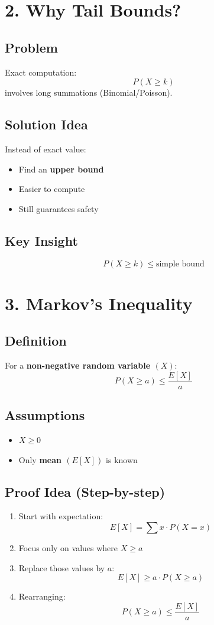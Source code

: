 \documentclass[11pt]{article}
\begin{document}
\section*{2. Why Tail Bounds?}

\subsection*{Problem}
Exact computation:
\[
P(X \ge k)
\]
involves long summations (Binomial/Poisson).

\subsection*{Solution Idea}
Instead of exact value:
\begin{itemize}
\item Find an \textbf{upper bound}
\item Easier to compute
\item Still guarantees safety
\end{itemize}

\subsection*{Key Insight}
\[
P(X \ge k) \le \text{simple bound}
\]

\section*{3. Markov’s Inequality}

\subsection*{Definition}
For a \textbf{non-negative random variable $(X)$}:
\[
P(X \ge a) \le \frac{E[X]}{a}
\]

\subsection*{Assumptions}
\begin{itemize}
\item $X \ge 0$
\item Only \textbf{mean $(E[X])$} is known
\end{itemize}

\subsection*{Proof Idea (Step-by-step)}
\begin{enumerate}
\item Start with expectation:
\[
E[X] = \sum x \cdot P(X=x)
\]
\item Focus only on values where $X \ge a$
\item Replace those values by $a$:
\[
E[X] \ge a \cdot P(X \ge a)
\]
\item Rearranging:
\[
P(X \ge a) \le \frac{E[X]}{a}
\]
\end{enumerate}
\end{document}
